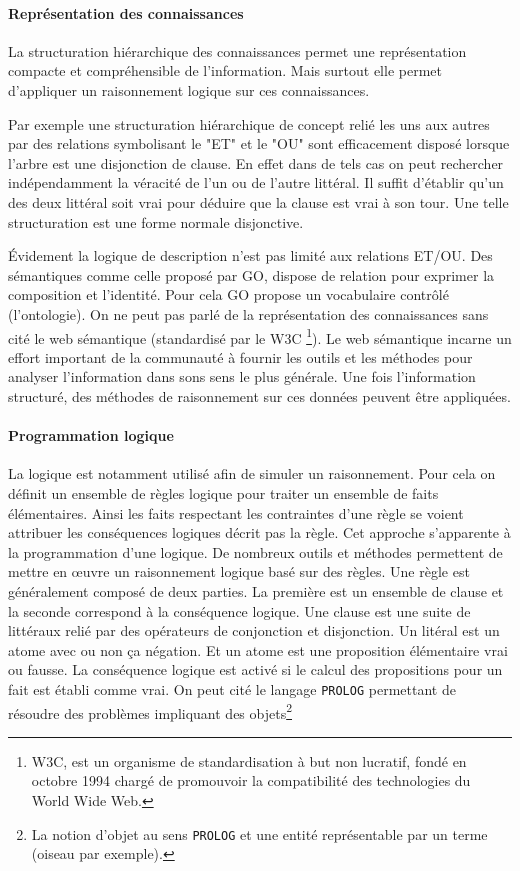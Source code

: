 \begin{refsegment}
    \paragraph{Représentation des connaissances}
    La structuration hiérarchique des connaissances permet une représentation compacte et compréhensible de l'information. Mais surtout elle permet d'appliquer un raisonnement logique sur ces connaissances.
    
    Par exemple une structuration hiérarchique de concept relié les uns aux autres par des relations symbolisant le "ET" et le "OU" sont efficacement disposé lorsque l'arbre est une disjonction de clause.
    En effet dans de tels cas on peut rechercher indépendamment la véracité de l'un ou de l'autre littéral. Il suffit d'établir qu'un des deux littéral soit vrai pour déduire que la clause est vrai à son tour. Une telle structuration est une forme normale disjonctive.
    
    Évidement la logique de description n'est pas limité aux relations ET/OU. Des sémantiques comme celle proposé par \acrfull{GO}, dispose de relation pour exprimer la composition et l'identité. Pour cela  \acrfull{GO} propose un vocabulaire contrôlé (l'ontologie). On ne peut pas parlé de la représentation des connaissances sans cité le web sémantique (standardisé par le W3C \footnote{W3C, est un organisme de standardisation à but non lucratif, fondé en octobre 1994 chargé de promouvoir la compatibilité des technologies du World Wide Web.}). Le web sémantique incarne un effort important de la communauté à fournir les outils et les méthodes pour analyser l'information dans sons sens le plus générale. Une fois l'information structuré, des méthodes de raisonnement sur ces données peuvent être appliquées.
    
    \paragraph{Programmation logique} La logique est notamment utilisé afin de simuler un raisonnement. Pour cela on définit un ensemble de règles logique pour traiter un ensemble de faits élémentaires. Ainsi les faits respectant les contraintes d'une règle se voient attribuer les conséquences logiques décrit pas la règle. Cet approche s'apparente à la programmation d'une logique. De nombreux outils et méthodes permettent de mettre en œuvre un raisonnement logique basé sur des règles. Une règle est généralement composé de deux parties. La première est un ensemble de clause et la seconde correspond à la conséquence logique.
    Une clause est une suite de littéraux relié par des opérateurs de conjonction et disjonction. Un litéral est un atome avec ou non ça négation. Et un atome est une proposition élémentaire vrai ou fausse. La conséquence logique est activé si le calcul des propositions pour un fait est établi comme vrai. On peut cité le langage \texttt{PROLOG} \cite{colmerauer1990introduction,clocksin2003programming} permettant de résoudre des problèmes impliquant des objets\footnote{La notion d'objet au sens \texttt{PROLOG} et une entité représentable par un terme (oiseau par exemple). }
    

\end{refsegment}

